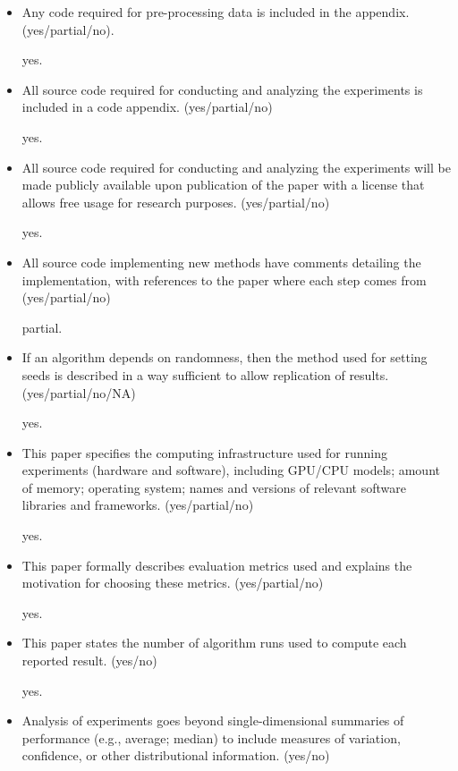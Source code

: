 \begin{itemize}
\item Any code required for pre-processing data is included in the appendix. (yes/partial/no).

yes.

\item All source code required for conducting and analyzing the experiments is included in a code appendix. (yes/partial/no)

yes.

\item All source code required for conducting and analyzing the experiments will be made publicly available upon publication of the paper with a license that allows free usage for research purposes. (yes/partial/no)

yes.

\item All source code implementing new methods have comments detailing the implementation, with references to the paper where each step comes from (yes/partial/no)

partial.

\item If an algorithm depends on randomness, then the method used for setting seeds is described in a way sufficient to allow replication of results. (yes/partial/no/NA)

yes.

\item This paper specifies the computing infrastructure used for running experiments (hardware and software), including GPU/CPU models; amount of memory; operating system; names and versions of relevant software libraries and frameworks. (yes/partial/no)

yes.

\item This paper formally describes evaluation metrics used and explains the motivation for choosing these metrics. (yes/partial/no)

yes.

\item This paper states the number of algorithm runs used to compute each reported result. (yes/no)

yes.

\item Analysis of experiments goes beyond single-dimensional summaries of performance (e.g., average; median) to include measures of variation, confidence, or other distributional information. (yes/no)


\end{itemize}
